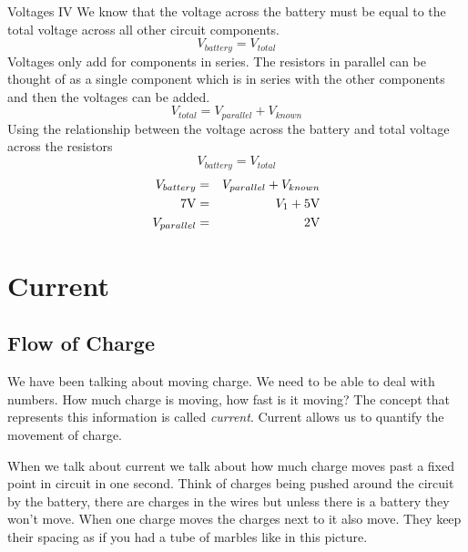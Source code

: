 \begin{wex}{Voltages IV}
{
We know that the voltage across the battery must be equal to the total voltage across all other circuit components. 
\begin{equation*}
V_{battery} = V_{total}
\end{equation*}
Voltages only add for components in series. The resistors in parallel can be thought of as a single component which is in series with the other components and then the voltages can be added.
\begin{equation*}
V_{total} = V_{parallel} + V_{known}
\end{equation*}
Using the relationship between the voltage across the battery and total voltage across the resistors
\begin{equation*}
V_{battery} = V_{total}
\end{equation*}
\begin{eqnarray*}
V_{battery} &=& V_{parallel} + V_{known}\\
7\rm{V} & = & V_{1} + 5\rm{V} \\
 V_{parallel} & = & 2\rm{V}
\end{eqnarray*}
}
\end{wex}








\section{Current}

\subsection{Flow of Charge}

We have been talking about moving charge. We need to be able to deal with numbers. How much charge is moving, how fast is it moving? The concept that represents this information is called \emph{current}. Current allows us to quantify the movement of charge.

When we talk about current we talk about how much charge moves past a fixed point in circuit in one second. Think of charges being pushed around the circuit by the battery, there are charges in the wires but unless there is a battery they won't move. When one charge moves the charges next to it also move. They keep their spacing as if you had a tube of marbles like in this picture.

